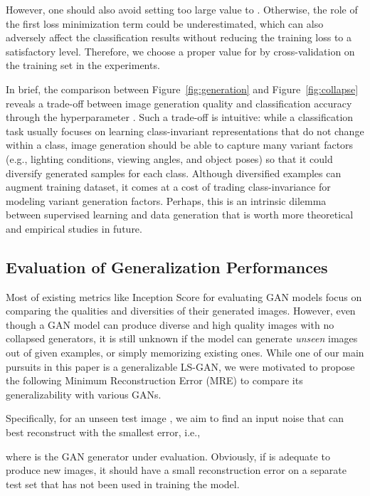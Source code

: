 \documentclass[11pt,fullpage, letterpaper,twoside]{article}
\newcommand{\1}[1]{\mathds{1}_{\left[#1\right]}}
\begin{document}
However, one should also avoid setting too large value to .  Otherwise, the role of the first loss minimization term could be underestimated, which can also adversely affect the classification results without reducing the training loss to a satisfactory level.  Therefore, we choose a proper value for  by cross-validation on the training set in the experiments.


In brief, the comparison between Figure~\ref{fig:generation} and Figure~\ref{fig:collapse} reveals a trade-off between image generation quality and classification accuracy through the hyperparameter . Such a trade-off is intuitive: while a classification task usually focuses on learning class-invariant representations that do not change within a class, image generation should be able to capture many variant factors (e.g., lighting conditions, viewing angles, and object poses) so that it could diversify generated samples for each class. Although diversified examples can augment training dataset, it comes at a cost of trading class-invariance for modeling variant generation factors. Perhaps, this is an intrinsic dilemma between supervised learning and data generation that is worth more theoretical and empirical studies in future.

\subsection{Evaluation of Generalization Performances}\label{sec:eval_gen}






Most of existing metrics like Inception Score \cite{salimans2016improved} for evaluating GAN models focus on comparing the qualities and diversities of their generated images. However, even though a GAN model can produce diverse and high quality images with no collapsed generators, it is still unknown if the model can generate {\em unseen} images out of given examples, or simply memorizing existing ones.  While one of our main pursuits in this paper is a generalizable LS-GAN, we were motivated to propose the following Minimum Reconstruction Error (MRE) to compare its generalizability with various GANs.







Specifically, for an unseen test image , we aim to find an input noise  that can best reconstruct  with the smallest error, i.e.,

where  is the GAN generator under evaluation. Obviously, if  is adequate to produce new images, it should have a small reconstruction error on a separate test set that has not been used in training the model.
\end{document}

